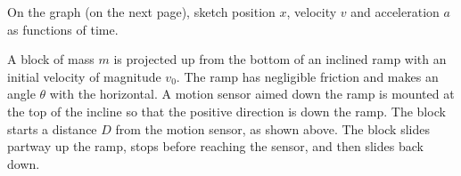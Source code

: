 \documentclass{../../oss-apphys-exam}
\begin{document}
\begin{questions}
\begin{parts}
  \item On the graph (on the next page), sketch position $x$, velocity $v$ and
    acceleration $a$ as functions of time.
  \end{parts}
  \begin{center}


  \end{center}
  \newpage



  \question A block of mass $m$ is projected up from the bottom of an inclined
  ramp with an initial velocity of magnitude $v_0$. The ramp has negligible
  friction and makes an angle $\theta$ with the horizontal. A motion sensor
  aimed down the ramp is mounted at the top of the incline so that the positive
  direction is down the ramp. The block starts a distance $D$ from the motion
  sensor, as shown above. The block slides partway up the ramp, stops before
  reaching the sensor, and then slides back down.
  \begin{parts}

\end{parts}
\end{questions}
\end{document}
